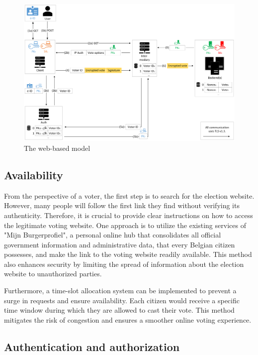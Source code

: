 \documentclass[a4paper,12pt,english]{article}
\begin{document}
\begin{figure}
    \centering
    \includegraphics[width=\textwidth]{Schematic}
    \caption{The web-based model}\label{fig:schematic}
\end{figure}

\subsection{Availability}\label{sec:design-availability}

From the perspective of a voter, the first step is to search for the election website. However, many people will follow the first link they find without verifying its authenticity. Therefore, it is crucial to provide clear instructions on how to access the legitimate voting website. One approach is to utilize the existing services of "Mijn Burgerprofiel", a personal online hub that consolidates all official government information and administrative data, that every Belgian citizen possesses, and make the link to the voting website readily available. This method also enhances security by limiting the spread of information about the election website to unauthorized parties.

Furthermore, a time-slot allocation system can be implemented to prevent a surge in requests and ensure availability. Each citizen would receive a specific time window during which they are allowed to cast their vote. This method mitigates the risk of congestion and ensures a smoother online voting experience.

\subsection{Authentication and authorization}\label{sec:design-auth}
\end{document}
